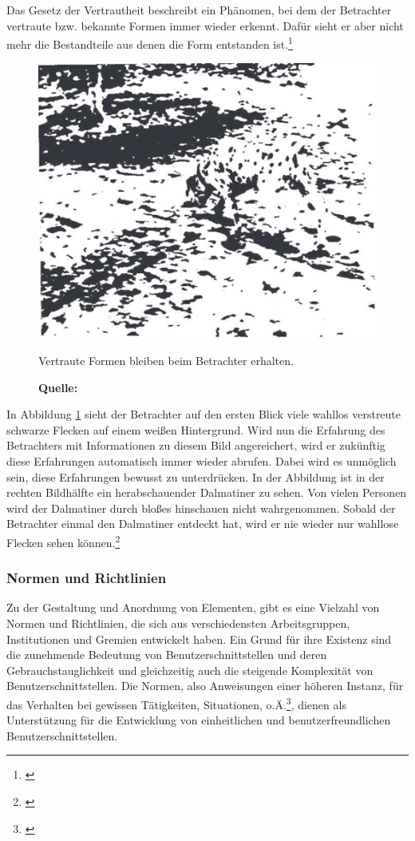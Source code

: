 Das Gesetz der Vertrautheit beschreibt ein Phänomen, bei dem der Betrachter vertraute bzw. bekannte Formen immer wieder erkennt. Dafür sieht er aber nicht mehr die Bestandteile aus denen die Form entstanden ist.\footnote{\cite[vgl.][63f]{Dahm2006}}
\begin{figure}[H]
  \centering
  \includegraphics[scale=0.62]{img/gesetz_der_Vertrautheit.PNG}
  \caption{Vertraute Formen bleiben beim Betrachter erhalten.}
  \caption*{\textbf{Quelle:}\cite[63]{Dahm2006}}
  \label{fig:vertrautheit}
\end{figure}
In Abbildung \ref{fig:vertrautheit} sieht der Betrachter auf den ersten Blick viele wahllos verstreute schwarze Flecken auf einem weißen Hintergrund. Wird nun die Erfahrung des Betrachters mit Informationen zu diesem Bild angereichert, wird er zukünftig diese Erfahrungen automatisch immer wieder abrufen. Dabei wird es unmöglich sein, diese Erfahrungen bewusst zu unterdrücken. In der Abbildung ist in der rechten Bildhälfte ein herabschauender Dalmatiner zu sehen. Von vielen Personen wird der Dalmatiner durch bloßes hinschauen nicht wahrgenommen. Sobald der Betrachter einmal den Dalmatiner entdeckt hat, wird er nie wieder nur wahllose Flecken sehen können.\footnote{\cite[vgl.][63f]{Dahm2006}}


\subsubsection{Normen und Richtlinien}
\label{sec:normenUndRichtlinien}
Zu der Gestaltung und Anordnung von Elementen, gibt es eine Vielzahl von Normen und Richtlinien, die sich aus verschiedensten Arbeitsgruppen, Institutionen und Gremien entwickelt haben. Ein Grund für ihre Existenz sind die zunehmende Bedeutung von Benutzerschnittstellen und deren Gebrauchstauglichkeit und gleichzeitig auch die steigende Komplexität von Benutzerschnittstellen. Die Normen, also Anweisungen einer höheren Instanz, für das Verhalten bei gewissen Tätigkeiten, Situationen, o.Ä.\footnote{\cite[vgl.][]{duden}}, dienen als Unterstützung für die Entwicklung von einheitlichen und benutzerfreundlichen Benutzerschnittstellen. 

